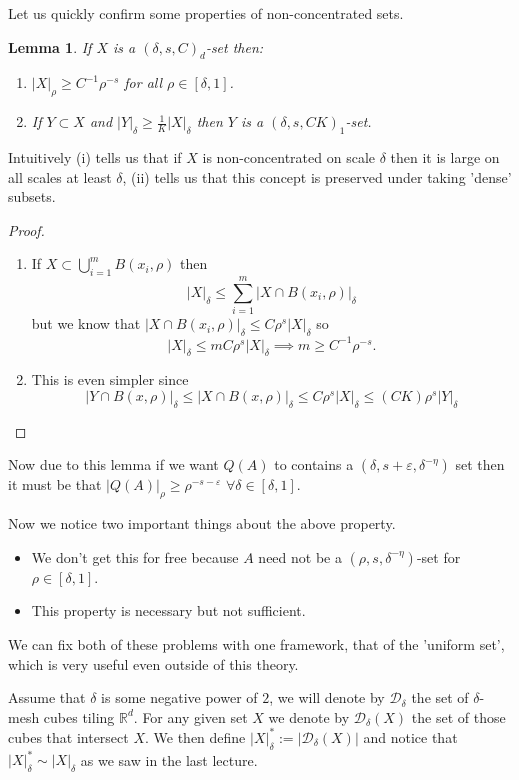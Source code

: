 \documentclass[12pt]{amsart}
\newtheorem{lemma}[theorem]{Lemma}
\newcommand{\RR}{\mathbb{R}}
\begin{document}
Let us quickly confirm some properties of non-concentrated sets.
\begin{lemma}
    If $X$ is a $(\delta, s, C)_d$-set then:
    \begin{enumerate}
        \item $|X|_\rho \geq C^{-1} \rho^{-s}$ for all $\rho \in [\delta,1]$. 
        \item If $Y \subset X$ and $|Y|_\delta \geq \frac{1}{K} |X|_\delta$ then $Y$ is a $(\delta, s, CK)_1$-set.
    \end{enumerate}
\end{lemma}
Intuitively (i) tells us that if $X$ is non-concentrated on scale $\delta$ then it is large on all scales at least $\delta$, (ii) tells us that this concept is preserved under taking 'dense' subsets.
\begin{proof}
    \begin{enumerate}
        \item If $X \subset \bigcup_{i=1}^m B(x_i, \rho)$ then 
        $$
            |X|_\delta \leq \sum_{i=1}^m |X \cap B(x_i, \rho)|_\delta  
        $$
        but we know that $|X \cap B(x_i, \rho)|_\delta \leq C \rho^s |X|_\delta$
        so
        $$
            |X|_\delta \leq m C \rho^s |X|_\delta \implies m \geq C^{-1} \rho^{-s}.
        $$
        \item This is even simpler since
        $$
            |Y \cap B(x, \rho)|_\delta \leq |X \cap B(x,\rho)|_\delta \leq C \rho^s |X|_\delta \leq (C K) \rho^s |Y|_\delta
        $$
    \end{enumerate}
\end{proof}

Now due to this lemma if we want $Q(A)$ to contains a $(\delta, s + \varepsilon, \delta^{-\eta})$ set then it must be that $|Q(A)|_\rho \geq \rho^{-s-\varepsilon}$ $\forall \delta \in [\delta,1]$.

Now we notice two important things about the above property.
\begin{itemize}
    \item We don't get this for free because $A$ need not be a $(\rho, s, \delta^{-\eta})$-set for $\rho \in [\delta,1]$.
    \item This property is necessary but not sufficient.
\end{itemize}
We can fix both of these problems with one framework, that of the 'uniform set', which is very useful even outside of this theory.

Assume that $\delta$ is some negative power of $2$, we will denote by $\mathcal{D}_\delta$ the set of $\delta$-mesh cubes tiling $\RR^d$. For any given set $X$ we denote by $\mathcal{D}_\delta (X)$ the set of those cubes that intersect $X$. We then define $|X|_\delta^* := |\mathcal{D}_\delta (X)|$ and notice that $|X|_\delta^* \sim |X|_\delta$ as we saw in the last lecture.
\end{document}
